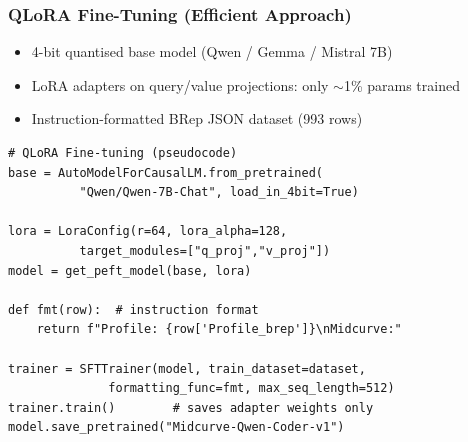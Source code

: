 \begin{frame}[fragile]\frametitle{QLoRA Fine-Tuning (Efficient Approach)}
	\begin{itemize}
	\item 4-bit quantised base model (Qwen / Gemma / Mistral 7B)
	\item LoRA adapters on query/value projections: only $\sim$1\% params trained
	\item Instruction-formatted BRep JSON dataset (993 rows)
	\end{itemize}
\begin{lstlisting}[basicstyle=\tiny, breaklines=true, breakatwhitespace=true]
# QLoRA Fine-tuning (pseudocode)
base = AutoModelForCausalLM.from_pretrained(
          "Qwen/Qwen-7B-Chat", load_in_4bit=True)

lora = LoraConfig(r=64, lora_alpha=128,
          target_modules=["q_proj","v_proj"])
model = get_peft_model(base, lora)

def fmt(row):  # instruction format
    return f"Profile: {row['Profile_brep']}\nMidcurve:"

trainer = SFTTrainer(model, train_dataset=dataset,
              formatting_func=fmt, max_seq_length=512)
trainer.train()        # saves adapter weights only
model.save_pretrained("Midcurve-Qwen-Coder-v1")
\end{lstlisting}
\end{frame}


